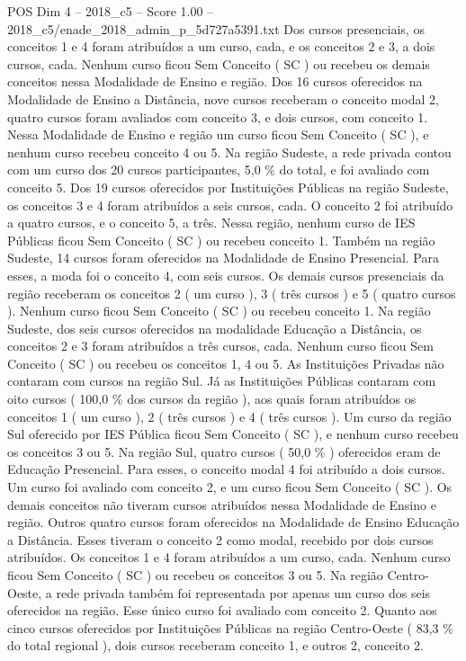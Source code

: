 \begin{textsample}{POS Dim 4 – 2018\_c5 – Score 1.00 – 2018\_c5/enade\_2018\_admin\_p\_5d727a5391.txt}
Dos cursos presenciais, os conceitos 1 e 4 foram atribuídos a um curso, cada, e os conceitos 2 e 3, a dois cursos, cada.
Nenhum curso ficou Sem Conceito ( SC ) ou recebeu os demais conceitos nessa Modalidade de Ensino e região.
Dos 16 cursos oferecidos na Modalidade de Ensino a Distância, nove cursos receberam o conceito modal 2, quatro cursos foram avaliados com conceito 3, e dois cursos, com conceito 1.
Nessa Modalidade de Ensino e região um curso ficou Sem Conceito ( SC ), e nenhum curso recebeu conceito 4 ou 5.
Na região Sudeste, a rede privada contou com um curso dos 20 cursos participantes, 5,0 \% do total, e foi avaliado com conceito 5.
Dos 19 cursos oferecidos por Instituições Públicas na região Sudeste, os conceitos 3 e 4 foram atribuídos a seis cursos, cada.
O conceito 2 foi atribuído a quatro cursos, e o conceito 5, a três.
Nessa região, nenhum curso de IES Públicas ficou Sem Conceito ( SC ) ou recebeu conceito 1.
Também na região Sudeste, 14 cursos foram oferecidos na Modalidade de Ensino Presencial.
Para esses, a moda foi o conceito 4, com seis cursos.
Os demais cursos presenciais da região receberam os conceitos 2 ( um curso ), 3 ( três cursos ) e 5 ( quatro cursos ).
Nenhum curso ficou Sem Conceito ( SC ) ou recebeu conceito 1.
Na região Sudeste, dos seis cursos oferecidos na modalidade Educação a Distância, os conceitos 2 e 3 foram atribuídos a três cursos, cada.
Nenhum curso ficou Sem Conceito ( SC ) ou recebeu os conceitos 1, 4 ou 5.
As Instituições Privadas não contaram com cursos na região Sul.
Já as Instituições Públicas contaram com oito cursos ( 100,0 \% dos cursos da região ), aos quais foram atribuídos os conceitos 1 ( um curso ), 2 ( três cursos ) e 4 ( três cursos ).
Um curso da região Sul oferecido por IES Pública ficou Sem Conceito ( SC ), e nenhum curso recebeu os conceitos 3 ou 5.
Na região Sul, quatro cursos ( 50,0 \% ) oferecidos eram de Educação Presencial.
Para esses, o conceito modal 4 foi atribuído a dois cursos.
Um curso foi avaliado com conceito 2, e um curso ficou Sem Conceito ( SC ).
Os demais conceitos não tiveram cursos atribuídos nessa Modalidade de Ensino e região.
Outros quatro cursos foram oferecidos na Modalidade de Ensino Educação a Distância.
Esses tiveram o conceito 2 como modal, recebido por dois cursos atribuídos.
Os conceitos 1 e 4 foram atribuídos a um curso, cada.
Nenhum curso ficou Sem Conceito ( SC ) ou recebeu os conceitos 3 ou 5.
Na região Centro-Oeste, a rede privada também foi representada por apenas um curso dos seis oferecidos na região.
Esse único curso foi avaliado com conceito 2.
Quanto aos cinco cursos oferecidos por Instituições Públicas na região Centro-Oeste ( 83,3 \% do total regional ), dois cursos receberam conceito 1, e outros 2, conceito 2.

\end{textsample}
